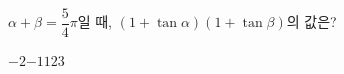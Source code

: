 $\alpha+\beta=\dfrac{5}{4}\pi$일 때, $(1+\tan\alpha)(1+\tan\beta)$의 값은?
\begin{choices32}{$-2$}{$-1$}{$1$}{$2$}{$3$}\end{choices32}
